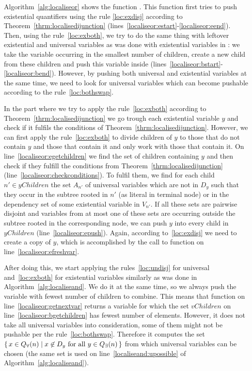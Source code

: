 \documentclass[
  digital, %
  color,
  twoside, %
  table,   %
  nolof,     %
  nolot,     %
]{fithesis3}
\let\setbuilder\set
\newcommand{\simpleset}[1]{\{{#1}\}}
\renewcommand{\set}[1]{\normalexpandarg\IfSubStr{#1}{|}{\setbuilder{#1}}{\simpleset{#1}}}
\theoremstyle{definition}
\theoremstyle{remark}
\newcommand{\vars}[1]{V_{#1}}
\newcommand{\eprefix}[1]{Q_{\exists}(#1)}
\newcommand{\uprefix}[1]{Q_{\forall}(#1)}
\begin{document}
Algorithm~\ref{alg:localiseor} shows the function . This function first tries to push existential quantifiers using the rule \eqref{loc:exdisj} according to Theorem~\ref{thrm:localisedijunction} (lines~\ref{localiseor:estart}-\ref{localiseor:eend}). Then, using the rule~\eqref{loc:exboth}, we try to do the same thing with leftover existential and universal variables as was done with existential variables in : we take the variable occurring in the smallest number of children, create a new child from these children and push this variable inside (lines~\ref{localiseor:bstart}-\ref{localiseor:bend}). However, by pushing both universal and existential variables at the same time, we need to look for universal variables which can become pushable according to the rule~\eqref{loc:bothswap}.

In the part where we try to apply the rule~\eqref{loc:exboth} according to Theorem~\ref{thrm:localisedijunction} we go trough each existential variable $y$ and check if it fulfils the conditions of Theorem~\ref{thrm:localisedijunction}. However, we can first apply the rule~\eqref{loc:exboth} to divide children of $y$ to those that do not contain $y$ and those that contain it and only work with those that contain it. On line~\ref{localiseor:egetchildren} we find the set of children containing $y$ and then check if they fulfill the conditions from Theorem~\ref{thrm:localisedijunction} (line~\ref{localiseor:checkconditions}). To fulfil them, we find for each child $n' \in yChildren$ the set $A_{n'}$ of universal variables which are not in $D_y$ such that they occur in the subtree rooted in $n'$ (as literal in terminal node) or in the dependency set of some existential variable in $\vars{n'}$. If all these sets are pairwise disjoint and variables from at most one of these sets are occurring outside the subtree rooted in the corresponding node, we can push $y$ into every child in $yChildren$ (line~\ref{localiseor:epush}). Again, according to~\eqref{loc:exdisj} we need to create a copy of $y$, which is accomplished by the call to function  on line~\ref{localiseor:efreshvar}.

After doing this, we start applying the rules~\eqref{loc:undisj} for universal and~\eqref{loc:exboth} for existential variables similarly as was done in Algorithm~\ref{alg:localiseand}. We do it at the same time, so we always push the variable with fewest number of children to combine. This means that function  on line~\ref{localiseor:getnextvar} returns a variable for which the set $vChildren$ on line~\ref{localiseor:bgetchildren} has fewest number of elements. However, it does not take all universal variables into consideration, some of them might not be pushable per the rule~\eqref{loc:bothswap}. Therefore it computes the set $\set{x \in \uprefix{n} | x \not\in D_y \text{ for all } y \in \eprefix{n}}$ from which universal variables can be chosen (the same set is used on line~\ref{localiseand:upossible} of Algorithm~\ref{alg:localiseand}).
\end{document}
